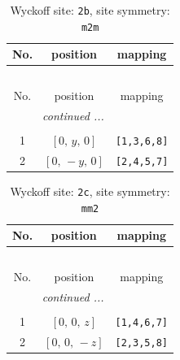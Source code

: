 \documentclass[fleqn,8pt]{jsarticle}
\begin{document}
\begin{longtable}{ccc}
\caption{Wyckoff site: {\tt 2b}, site symmetry: {\tt m2m}}
 \\
 \hline \hline
No. & position & mapping \\ \hline \endfirsthead

\multicolumn{2}{l}{\tablename\ \thetable{}} \\
 \hline \hline
No. & position & mapping \\ \hline \endhead

 \hline \hline
\multicolumn{2}{r}{\footnotesize\it continued ...} \\ \endfoot

 \hline \hline
\multicolumn{2}{r}{} \\ \endlastfoot

1 & $\left[ 0,\, y,\, 0 \right]$ & {\tt [1,3,6,8]} \\ \hline
2 & $\left[ 0,\, - y,\, 0 \right]$ & {\tt [2,4,5,7]} \\
\end{longtable}
\renewcommand{\arraystretch}{1.2}
\begin{longtable}{ccc}
\caption{Wyckoff site: {\tt 2c}, site symmetry: {\tt mm2}}
 \\
 \hline \hline
No. & position & mapping \\ \hline \endfirsthead

\multicolumn{2}{l}{\tablename\ \thetable{}} \\
 \hline \hline
No. & position & mapping \\ \hline \endhead

 \hline \hline
\multicolumn{2}{r}{\footnotesize\it continued ...} \\ \endfoot

 \hline \hline
\multicolumn{2}{r}{} \\ \endlastfoot

1 & $\left[ 0,\, 0,\, z \right]$ & {\tt [1,4,6,7]} \\ \hline
2 & $\left[ 0,\, 0,\, - z \right]$ & {\tt [2,3,5,8]} \\
\end{longtable}
\renewcommand{\arraystretch}{1.2}
\end{document}
